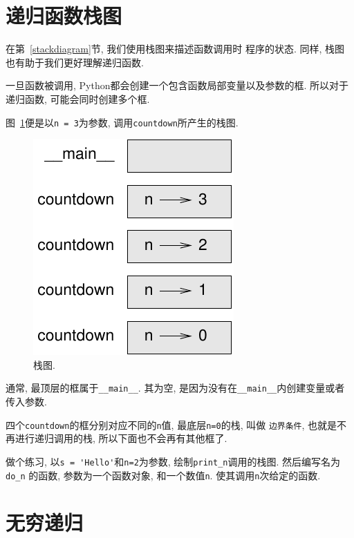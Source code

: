 \documentclass[10pt]{book}
\begin{document}
\section{递归函数栈图}
\label{recursive.stack}

在第~\ref{stackdiagram}节, 我们使用栈图来描述函数调用时
程序的状态. 
同样, 栈图也有助于我们更好理解递归函数. 

一旦函数被调用, Python都会创建一个包含函数局部变量以及参数的框. 
所以对于递归函数, 可能会同时创建多个框. 

图~\ref{fig.stack2}便是以{\tt n = 3}为参数, 调用{\tt countdown}所产生的栈图. 

\begin{figure}
\centerline
{\includegraphics[scale=0.8]{figs/stack2.pdf}}
\caption{栈图.}
\label{fig.stack2}
\end{figure}

通常, 最顶层的框属于\verb"__main__". 
其为空, 是因为没有在\verb"__main__"内创建变量或者传入参数. 

四个{\tt countdown}的框分别对应不同的{\tt n}值, 最底层{\tt n=0}的栈, 叫做
{\tt 边界条件},  也就是不再进行递归调用的栈, 所以下面也不会再有其他框了. 

做个练习, 以\verb"s = 'Hello'"和{\tt n=2}为参数, 绘制\verb"print_n"调用的栈图. 
然后编写名为 \verb"do_n" 的函数, 参数为一个函数对象, 和一个数值{\tt n}. 
使其调用{\tt n}次给定的函数. 


\section{无穷递归}
\end{document}
